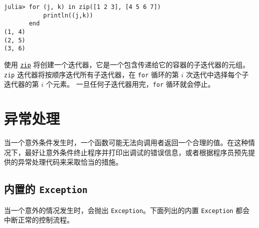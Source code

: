 \begin{verbatim}
julia> for (j, k) in zip([1 2 3], [4 5 6 7])
           println((j,k))
       end
(1, 4)
(2, 5)
(3, 6)
\end{verbatim}



使用 \hyperlink{11836366300100000234}{\texttt{zip}} 将创建一个迭代器，它是一个包含传递给它的容器的子迭代器的元组。 \texttt{zip} 迭代器将按顺序迭代所有子迭代器，在 \texttt{for} 循环的第  \(i\)  次迭代中选择每个子迭代器的第  \(i\)  个元素。 一旦任何子迭代器用完，\texttt{for} 循环就会停止。



\hypertarget{11112426789887598982}{}


\section{异常处理}



当一个意外条件发生时，一个函数可能无法向调用者返回一个合理的值。在这种情况下，最好让意外条件终止程序并打印出调试的错误信息，或者根据程序员预先提供的异常处理代码来采取恰当的措施。



\hypertarget{18218681852389631555}{}


\subsection{内置的 \texttt{Exception}}



当一个意外的情况发生时，会抛出 \texttt{Exception}。下面列出的内置 \texttt{Exception} 都会中断正常的控制流程。




